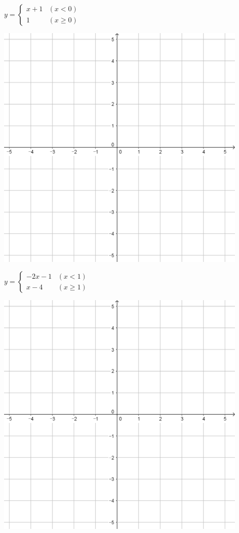 \documentclass[a4paper]{oblivoir}
\begin{document}
\begin{minipage}{0.45\textwidth}\centering
\(y=\begin{cases}x+1&(x<0)\\1&(x\ge0)\end{cases}\)
\par\bigskip\includegraphics[width=0.9\textwidth]{55}
\end{minipage}
\begin{minipage}{0.45\textwidth}\centering
\(y=\begin{cases}-2x-1&(x<1)\\x-4&(x\ge1)\end{cases}\)
\par\bigskip\includegraphics[width=0.9\textwidth]{55}
\end{minipage}\bigskip\bigskip\par
\end{document}
